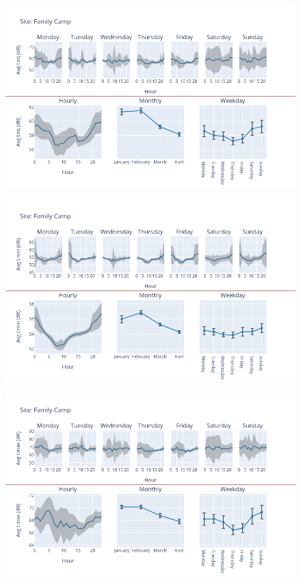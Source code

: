 \documentclass[12pt, oneside]{book}
\begin{document}
{ 
{\begin{figure}[H] 
 \centering 
\includegraphics[width=.88\textwidth, keepaspectratio]{image83} 
 \end{figure}}{} 

{\begin{figure}[H] 
 \centering 
\includegraphics[width=.88\textwidth, keepaspectratio]{image84} 
 \end{figure}}{} 

{\begin{figure}[H] 
 \centering 
\includegraphics[width=.88\textwidth, keepaspectratio]{image85} 
 \end{figure}}{} 

}
\end{document}
